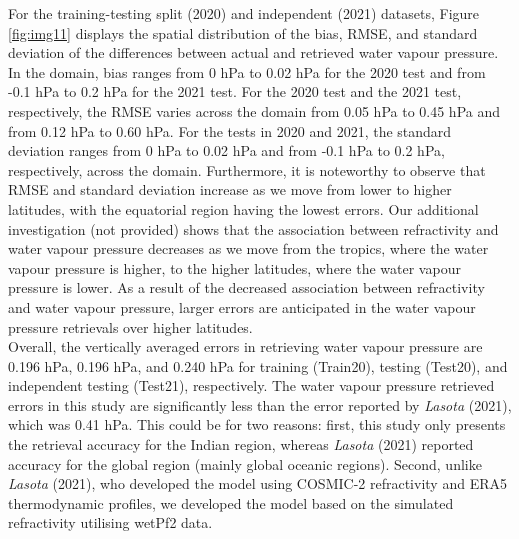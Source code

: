 \documentclass[a4paper,12pt,twoside]{article}
\begin{document}
\noindent For the training-testing split (2020) and independent (2021) datasets, Figure \ref{fig:img11} displays the spatial distribution of the bias, RMSE, and standard deviation of the differences between actual and retrieved water vapour pressure. In the domain, bias ranges from 0 hPa to 0.02 hPa for the 2020 test and from -0.1 hPa to 0.2 hPa for the 2021 test. For the 2020 test and the 2021 test, respectively, the RMSE varies across the domain from 0.05 hPa to 0.45 hPa and from 0.12 hPa to 0.60 hPa. For the tests in 2020 and 2021, the standard deviation ranges from 0 hPa to 0.02 hPa and from -0.1 hPa to 0.2 hPa, respectively, across the domain. Furthermore, it is noteworthy to observe that RMSE and standard deviation increase as we move from lower to higher latitudes, with the equatorial region having the lowest errors. Our additional investigation (not provided) shows that the association between refractivity and water vapour pressure decreases as we move from the tropics, where the water vapour pressure is higher, to the higher latitudes, where the water vapour pressure is lower. As a result of the decreased association between refractivity and water vapour pressure, larger errors are anticipated in the water vapour pressure retrievals over higher latitudes. \\

\noindent Overall, the vertically averaged errors in retrieving water vapour pressure are 0.196 hPa, 0.196 hPa, and 0.240 hPa for training (Train20), testing (Test20), and independent testing (Test21), respectively. The water vapour pressure retrieved errors in this study are significantly less than the error reported by \textit{Lasota} (2021), which was 0.41 hPa. This could be for two reasons: first, this study only presents the retrieval accuracy for the Indian region, whereas \textit{Lasota} (2021) reported accuracy for the global region (mainly global oceanic regions). Second, unlike \textit{Lasota} (2021), who developed the model using COSMIC-2 refractivity and ERA5 thermodynamic profiles, we developed the model based on the simulated refractivity utilising wetPf2 data. \\
\end{document}
